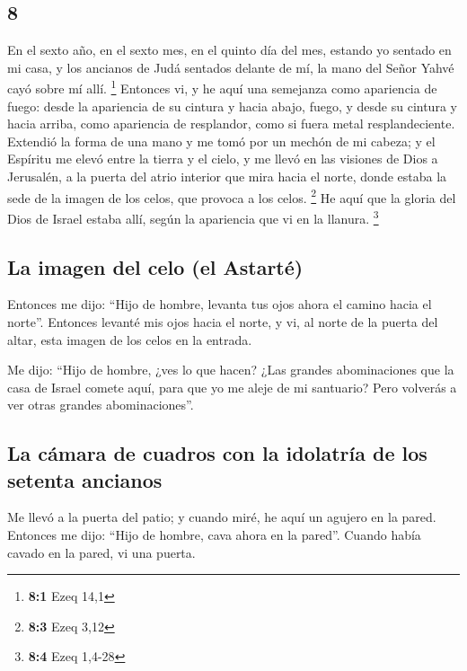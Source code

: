 \begin{paracol}{2}
\hypertarget{section-14}{%
\section{8}\label{section-14}}

 En el sexto año, en el sexto mes, en el quinto día del
mes, estando yo sentado en mi casa, y los ancianos de Judá sentados
delante de mí, la mano del Señor Yahvé cayó sobre mí allí. \footnote{\textbf{8:1}
  Ezeq 14,1}  Entonces vi, y he aquí una semejanza como
apariencia de fuego: desde la apariencia de su cintura y hacia abajo,
fuego, y desde su cintura y hacia arriba, como apariencia de resplandor,
como si fuera metal resplandeciente.  Extendió la forma de
una mano y me tomó por un mechón de mi cabeza; y el Espíritu me elevó
entre la tierra y el cielo, y me llevó en las visiones de Dios a
Jerusalén, a la puerta del atrio interior que mira hacia el norte, donde
estaba la sede de la imagen de los celos, que provoca a los celos.
\footnote{\textbf{8:3} Ezeq 3,12}  He aquí que la gloria
del Dios de Israel estaba allí, según la apariencia que vi en la
llanura. \footnote{\textbf{8:4} Ezeq 1,4-28}

\hypertarget{la-imagen-del-celo-el-astartuxe9}{%
\subsection{La imagen del celo (el
Astarté)}\label{la-imagen-del-celo-el-astartuxe9}}

 Entonces me dijo: ``Hijo de hombre, levanta tus ojos
ahora el camino hacia el norte''. Entonces levanté mis ojos hacia el
norte, y vi, al norte de la puerta del altar, esta imagen de los celos
en la entrada.

 Me dijo: ``Hijo de hombre, ¿ves lo que hacen? ¿Las
grandes abominaciones que la casa de Israel comete aquí, para que yo me
aleje de mi santuario? Pero volverás a ver otras grandes
abominaciones''.

\hypertarget{la-cuxe1mara-de-cuadros-con-la-idolatruxeda-de-los-setenta-ancianos}{%
\subsection{La cámara de cuadros con la idolatría de los setenta
ancianos}\label{la-cuxe1mara-de-cuadros-con-la-idolatruxeda-de-los-setenta-ancianos}}

 Me llevó a la puerta del patio; y cuando miré, he aquí un
agujero en la pared.  Entonces me dijo: ``Hijo de hombre,
cava ahora en la pared''. Cuando había cavado en la pared, vi una
puerta.


\end{paracol}
